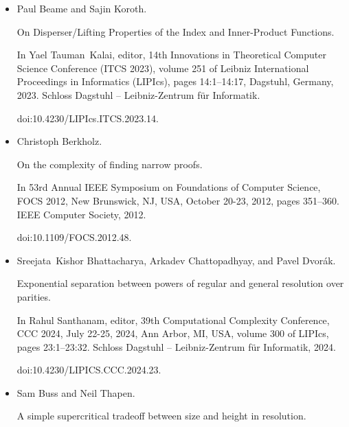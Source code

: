 \documentclass[10pt,a4paper]{article}
\begin{document}
\begin{itemize}
Journal of Computer and System Sciences, 74(3):323–334, 2008.


Computational Complexity 2003.


doi:10.1016/j.jcss.2007.06.025.





\item 
[5]

Paul Beame and Sajin Koroth.


On Disperser/Lifting Properties of the Index and Inner-Product
Functions.


In Yael Tauman Kalai, editor, 14th Innovations in Theoretical
Computer Science Conference (ITCS 2023), volume 251 of Leibniz
International Proceedings in Informatics (LIPIcs), pages 14:1–14:17,
Dagstuhl, Germany, 2023. Schloss Dagstuhl – Leibniz-Zentrum für
Informatik.


doi:10.4230/LIPIcs.ITCS.2023.14.





\item 
[6]

Christoph Berkholz.


On the complexity of finding narrow proofs.


In 53rd Annual IEEE Symposium on Foundations of Computer
Science, FOCS 2012, New Brunswick, NJ, USA, October 20-23, 2012, pages
351–360. IEEE Computer Society, 2012.


doi:10.1109/FOCS.2012.48.





\item 
[7]

Sreejata Kishor Bhattacharya, Arkadev Chattopadhyay, and Pavel Dvorák.


Exponential separation between powers of regular and general
resolution over parities.


In Rahul Santhanam, editor, 39th Computational Complexity
Conference, CCC 2024, July 22-25, 2024, Ann Arbor, MI, USA, volume 300
of LIPIcs, pages 23:1–23:32. Schloss Dagstuhl – Leibniz-Zentrum
für Informatik, 2024.


doi:10.4230/LIPICS.CCC.2024.23.





\item 
[8]

Sam Buss and Neil Thapen.


A simple supercritical tradeoff between size and height in
resolution.



\end{itemize}
\end{document}
